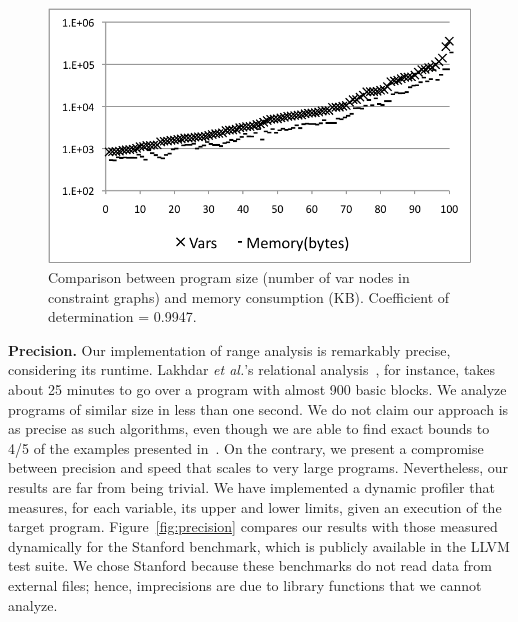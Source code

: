 \documentclass[preprint]{sigplanconf}[10pt]
\begin{document}
\begin{figure}[t!]
\begin{center}
\includegraphics[width=\columnwidth]{images/MemCorr}
\end{center}
\caption{\label{fig:MemCorr}
Comparison between program size (number of var nodes in constraint
graphs) and memory consumption (KB).
Coefficient of determination = 0.9947.
}
\end{figure}

\noindent
\textbf{Precision.}
Our implementation of range analysis is remarkably precise, considering its
runtime.
Lakhdar {\em et al.}'s relational analysis~\cite{Lakhdar11}, for instance, takes
about 25 minutes to go over a program with almost 900 basic blocks.
We analyze programs of similar size in less than one second.
We do not claim our approach is as precise as such algorithms, even though we
are able to find exact bounds to 4/5 of the examples presented
in~\cite{Lakhdar11}.
On the contrary, we present a compromise between precision and speed
that scales to very large programs.
Nevertheless, our results are far from being trivial.
We have implemented a dynamic profiler that measures, for each variable,
its upper and lower limits, given an execution of the target program.
Figure~\ref{fig:precision} compares our results with those measured
dynamically for the Stanford benchmark, which is publicly
available in the LLVM test suite.
We chose Stanford because these benchmarks do not read data from external
files; hence, imprecisions are due to library functions that we cannot
analyze.
\end{document}
